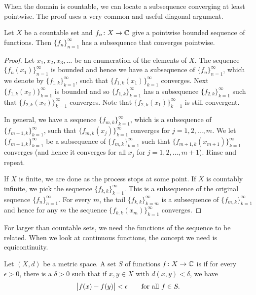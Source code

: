 When the domain is countable, we can locate a subsequence
converging at least pointwise.
The proof uses a very common and useful diagonal argument.

\begin{prop} \label{prop:subsequenceoncountableX}
Let $X$ be a countable set and $f_n \colon X \to {\mathbb{C}}$ give a pointwise bounded
sequence of functions.  Then $\{ f_n \}_{n=1}^\infty$ has a subsequence that converges
pointwise.
\end{prop}

\begin{proof}
Let $x_1,x_2,x_3,\ldots$ be an enumeration of the elements of $X$.
The sequence $\{ f_n(x_1) \}_{n=1}^\infty$ is bounded and hence
we have a subsequence of $\{ f_n \}_{n=1}^{\infty}$, which we denote by
$\{ f_{1,k} \}_{k=1}^\infty$,
such that
$\{ f_{1,k}(x_1) \}_{k=1}^\infty$ converges.
Next $\{ f_{1,k}(x_2) \}_{k=1}^\infty$ is bounded and so 
$\{ f_{1,k} \}_{k=1}^\infty$ has a subsequence
$\{ f_{2,k} \}_{k=1}^\infty$ such that
$\{ f_{2,k}(x_2) \}_{k=1}^\infty$ converges.  Note that
$\{ f_{2,k}(x_1) \}_{k=1}^\infty$ is still convergent.

In general, we have a sequence $\{ f_{m,k} \}_{k=1}^\infty$,
which is a subsequence of $\{ f_{m-1,k} \}_{k=1}^\infty$,
such that $\{ f_{m,k}(x_j) \}_{k=1}^\infty$ converges for $j=1,2,\ldots, m$.
We let $\{ f_{m+1,k} \}_{k=1}^\infty$ be a subsequence of
$\{ f_{m,k} \}_{k=1}^\infty$
such that
$\{ f_{m+1,k}(x_{m+1}) \}_{k=1}^\infty$ converges (and hence it converges for all
$x_j$ for $j=1,2,\ldots,m+1$).  Rinse and repeat.

If $X$ is finite, we are done as the process stops at some point.
If $X$ is countably infinite,
we pick the sequence
$\{ f_{k,k} \}_{k=1}^\infty$.
This is a subsequence of the original sequence $\{ f_n \}_{n=1}^\infty$.
For every $m$, the tail $\{ f_{k,k} \}_{k=m}^\infty$ is a subsequence of
$\{ f_{m,k} \}_{k=1}^\infty$
and hence for any $m$ the sequence $\{ f_{k,k}(x_m) \}_{k=1}^\infty$ converges.
\end{proof}

For larger than countable sets,
we need the functions of the sequence to be related.  When we look at
continuous functions, the concept we need is equicontinuity.

\begin{defn}
Let $(X,d)$ be a metric space.
A set $S$ of functions
$f \colon X \to {\mathbb{C}}$ is 
\emph{}
if for every $\epsilon > 0$, there is a $\delta > 0$
such that if $x,y \in X$ with $d(x,y) < \delta$, we have
\begin{equation*}
\bigl\lvert {f(x)-f(y)} \bigr\rvert < \epsilon \qquad \text{for all } f \in S .
\end{equation*}
\end{defn}

